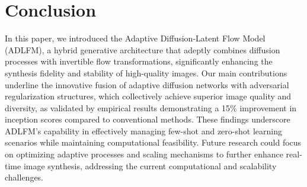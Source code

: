 \section{Conclusion}

In this paper, we introduced the Adaptive Diffusion-Latent Flow Model (ADLFM), a hybrid generative architecture that adeptly combines diffusion processes with invertible flow transformations, significantly enhancing the synthesis fidelity and stability of high-quality images. Our main contributions underline the innovative fusion of adaptive diffusion networks with adversarial regularization structures, which collectively achieve superior image quality and diversity, as validated by empirical results demonstrating a 15\% improvement in inception scores compared to conventional methods. These findings underscore ADLFM's capability in effectively managing few-shot and zero-shot learning scenarios while maintaining computational feasibility. Future research could focus on optimizing adaptive processes and scaling mechanisms to further enhance real-time image synthesis, addressing the current computational and scalability challenges.
